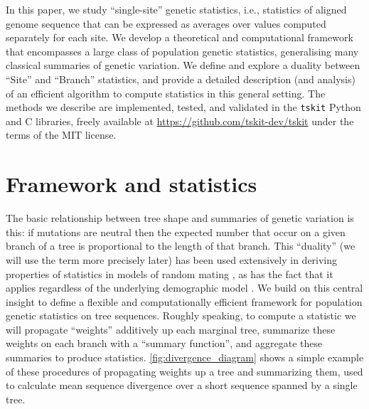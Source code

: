 \documentclass{article}
\newcommand{\tskit}{{\texttt{tskit}}}
\begin{document}
In this paper, we study ``single-site'' genetic statistics,
i.e., statistics of aligned genome sequence that can be expressed as averages over values computed
separately for each site. We develop a theoretical and computational framework
that encompasses a large class of population genetic statistics, generalising
many classical summaries of genetic variation. We define
and explore a duality between ``Site'' and ``Branch'' statistics, and
provide a detailed description (and analysis) of an efficient algorithm
to compute statistics in this general setting.
The methods we describe are implemented, tested, and validated in the \tskit{}
Python and C libraries, freely available at \url{https://github.com/tskit-dev/tskit}
under the terms of the MIT license.

\section*{Framework and statistics}

The basic relationship between tree shape and summaries of genetic variation
is this: if mutations are neutral then the expected number that occur on a
given branch of a tree is proportional to the length of that branch.
This ``duality'' (we will use the term more precisely later) has been
used extensively in deriving properties of statistics in models of random mating
\citep[e.g.,][]{tajima1983evolutionary,tavare1984lineofdescent,fu1995statistical},
as has the fact that it applies regardless of the underlying demographic model
\citep[e.g.,][]{gillespie1979evolutionary,hudson1983properties,slatkin1991inbreeding,
mcvean2002genealogical,lohse2016efficient,ralph2019empirical}. We build on this central
insight to define a flexible and computationally efficient framework for
population genetic statistics on tree sequences.
Roughly speaking, to compute a statistic we will
propagate ``weights'' additively up each marginal tree,
summarize these weights on each branch with a ``summary function'',
and aggregate these summaries to produce statistics.
\autoref{fig:divergence_diagram} shows a simple example of these procedures
of propagating weights up a tree and summarizing them,
used to calculate mean sequence divergence over a short sequence spanned by a single tree.
\end{document}
